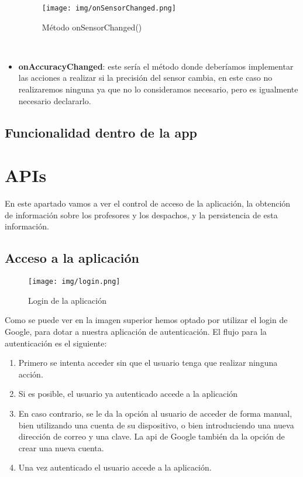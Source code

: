\documentclass[12pt, a4paper, titlepage]{article}
\begin{document}
\begin{itemize}
    		\begin{figure}[h!]
    			\begin{center}
    				\texttt{[image: img/onSensorChanged.png]}
    				\caption{Método onSensorChanged()}
    			\end{center}
    		\end{figure}\\
    		\item \textbf{onAccuracyChanged}: este sería el método donde deberíamos implementar las acciones a realizar si la precisión del sensor cambia, en este caso no realizaremos ninguna ya que no lo consideramos necesario, pero es igualmente necesario declararlo.
    	\end{itemize}

    	\subsection{Funcionalidad dentro de la app}
	\clearpage

	\section{APIs}
	En este apartado vamos a ver el control de acceso de la aplicación, la obtención de información sobre los profesores y los despachos, y la persistencia de esta información.
	
	\subsection{Acceso a la aplicación}
		\begin{figure}[h!]
		\begin{center}
			\texttt{[image: img/login.png]}
			\caption{Login de la aplicación}
		\end{center}
	\end{figure}
	
	Como se puede ver en la imagen superior hemos optado por utilizar el login de Google, para dotar a nuestra aplicación de autenticación. El flujo para la autenticación es el siguiente:
	\begin{enumerate}
		\item Primero se intenta acceder sin que el usuario tenga que realizar ninguna acción.
		\item Si es posible, el usuario ya autenticado accede a la aplicación
		\item En caso contrario, se le da la opción al usuario de acceder de forma manual, bien utilizando una cuenta de su dispositivo, o bien introduciendo una nueva dirección de correo y una clave. La api de Google también da la opción de crear una nueva cuenta.
		\item Una vez autenticado el usuario accede a la aplicación.
	\end{enumerate}
\end{document}
